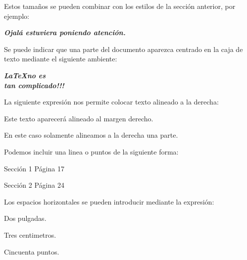 \documentclass[letterpaper,11pt]{article}
\begin{document}
Estos tamaños se pueden combinar con los estilos de la sección anterior, por ejemplo:

\medskip

\begin{Large}
\textbf{\textit{Ojalá estuviera poniendo atención.}}
\end{Large}


Se puede indicar que una parte del documento aparezca centrado en la caja de texto mediante el siguiente ambiente:

\begin{center}
\LARGE{\textbf{\textit{\LaTeX no es \\ tan complicado!!!}}}
\end{center}


La siguiente expresión nos permite colocar texto alineado a la derecha:

\hfill Este texto aparecerá alineado al margen derecho.

\bigskip

En este caso solamente alineamos a la derecha \hfill una parte.

Podemos incluir una linea o puntos de la siguiente forma:

\bigskip

Sección 1 \hrulefill Página 17

\bigskip

Sección 2 \dotfill Página 24


Los espacios horizontales se pueden introducir mediante la expresión:

\hspace{2in}Dos pulgadas.

\hspace{3cm}Tres centimetros.

\hspace{50pt}Cincuenta puntos.
\end{document}
